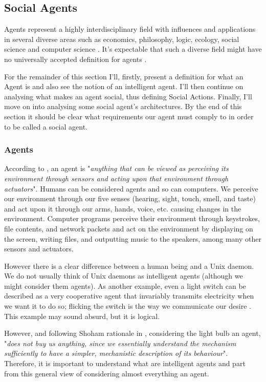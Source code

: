 \subsection{Social Agents}
\label{ssec:social-agents}
Agents represent a highly interdisciplinary field with influences and applications in several diverse areas such as economics, philosophy, logic, ecology, social science and computer science \cite{wooldridge:multiagent-systems}.
It's expectable that such a diverse field might have no universally accepted definition for agents \cite{wooldridge:intelligentagents}.

For the remainder of this section I'll, firstly, present a definition for what an Agent is and also see the notion of an intelligent agent.
I'll then continue on analysing what makes an agent social, thus defining Social Actions.
Finally, I'll move on into analysing some social agent's architectures.
By the end of this section it should be clear what requirements our agent must comply to in order to be called a social agent.

\subsubsection{Agents}
According to \cite{russell&norvig:aima}, an agent is "\textit{anything that can be viewed as perceiving its environment through sensors and acting upon that environment through actuators}".
Humans can be considered agents and so can computers.
We perceive our environment through our five senses (hearing, sight, touch, smell, and taste) and act upon it through our arms, hands, voice, etc. causing changes in the environment.
Computer programs perceive their environment through keystrokes, file contents, and network packets and act on the environment by displaying on the screen, writing files, and outputting music to the speakers, among many other sensors and actuators.

However there is a clear difference between a human being and a Unix daemon.
We do not usually think of Unix daemons as intelligent agents (although we might consider them agents).
As another example, even a light switch can be described as a very cooperative agent that invariably transmits electricity when we want it to do so; flicking the switch is the way we communicate our desire \cite{shoham:agentorientedprogramming}.
This example may sound absurd, but it is logical.

However, and following Shoham rationale in \cite{shoham:agentorientedprogramming}, considering the light bulb an agent, "\textit{does not buy us anything, since we essentially understand the mechanism sufficiently to have a simpler, mechanistic description of its behaviour}".
Therefore, it is important to understand what are intelligent agents and part from this general view of considering almost everything an agent.

